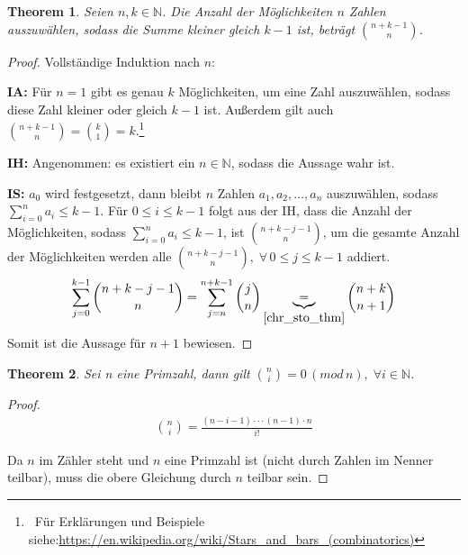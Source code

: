 \documentclass[12pt,oneside]{article}
\newtheorem{theorem}{Theorem}[section]
\theoremstyle{remark}
\theoremstyle{definition}
\begin{document}
\begin{flushleft}
\begin{theorem}\label{number_of_choices}
Seien $n,k \in \mathbb{N}$. Die Anzahl der Möglichkeiten $n$ Zahlen auszuwählen, sodass die Summe kleiner gleich $k - 1$ ist, beträgt ${n + k - 1 \choose n}$.
\end{theorem}

\begin{proof}
Vollständige Induktion nach $n$:

\textbf{IA:} Für $n = 1$ gibt es genau $k$ Möglichkeiten, um eine Zahl auszuwählen, sodass diese Zahl kleiner oder gleich $k - 1$ ist. Außerdem gilt auch ${n + k - 1 \choose n} = {k \choose 1} = k$.\footnote{$\,$ Für Erklärungen und Beispiele siehe:\url{https://en.wikipedia.org/wiki/Stars_and_bars_(combinatorics)}}\newline  

\textbf{IH:} Angenommen: es existiert ein $n \in \mathbb{N}$, sodass die Aussage wahr ist.\newline

\textbf{IS:} $a_0$ wird festgesetzt, dann bleibt $n$ Zahlen $a_1,a_2, \dots,a_n$ auszuwählen, sodass $\sum_{i = 0}^{n} a_i \leq k - 1$. Für $ 0 \leq i \leq k - 1$ folgt aus der IH, dass die Anzahl der Möglichkeiten, sodass $\sum_{i = 0}^{n} a_i \leq k - 1$, ist ${n + k - j - 1 \choose n}$, um die gesamte Anzahl der Möglichkeiten werden alle ${n + k - j - 1 \choose n}, \; \forall  \, 0 \leq j \leq k - 1 $ addiert.
\begin{align*}
    \sum_{j = 0}^{k - 1}{n + k - j - 1 \choose n} = \sum_{j = n}^{n + k -1} {j \choose n} \underbrace{=}_{\ref{chr_sto_thm}} {n + k \choose n + 1}
\end{align*}
Somit ist die Aussage für $n + 1$ bewiesen. 
\end{proof}

\smallskip


\bigskip

\begin{theorem}\label{th_25}
Sei n eine Primzahl, dann gilt ${n \choose i} = 0 \, ( mod \, n), \; \forall i \in \mathbb{N}$.
\end{theorem}

\begin{proof}
\begin{align*}\label{modb}
    {n \choose i} = \frac{(n - i - 1) \cdot  \cdot  \cdot (n - 1) \cdot n }{i!}
\end{align*}

Da $n$ im Zähler steht und $n$ eine Primzahl ist (nicht durch Zahlen im Nenner teilbar), muss die obere Gleichung  durch $n$ teilbar sein. 
\end{proof}


\end{flushleft}
\end{document}
